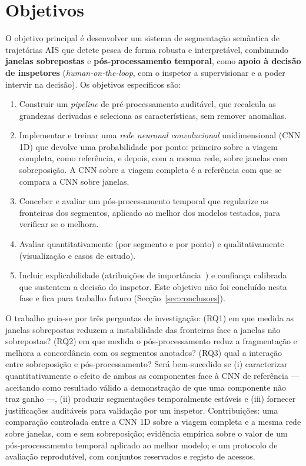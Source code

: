 \documentclass{article}
\newcommand{\revtext}[2]{{\color{#1}#2}}
\begin{document}
\section{Objetivos}
\label{sec:objetivos}

O objetivo principal é desenvolver um sistema de segmentação semântica de trajetórias AIS que detete pesca de forma robusta e interpretável, combinando \textbf{janelas sobrepostas} e \textbf{pós-processamento temporal}, como \textbf{apoio à decisão de inspetores} (\revtext{rev062}{\emph{human-on-the-loop}, com o inspetor a supervisionar e a poder intervir na decisão}). Os objetivos específicos são:

\begin{enumerate}
    \item Construir um \emph{pipeline} de pré-processamento auditável, que recalcula as grandezas derivadas e seleciona as características, sem remover anomalias.
    \item Implementar e treinar uma \emph{rede neuronal convolucional} unidimensional (CNN 1D) que devolve uma probabilidade por ponto: primeiro sobre a viagem completa, como referência, e depois, com a mesma rede, sobre janelas com sobreposição. A CNN sobre a viagem completa é a referência com que se compara a CNN sobre janelas.
    \item Conceber e avaliar um pós-processamento temporal \revtext{rev062}{que regularize as fronteiras dos segmentos, aplicado ao melhor dos modelos testados, para verificar se o melhora}.
    \item Avaliar quantitativamente (por segmento e por ponto) e qualitativamente (visualização e casos de estudo).
    \item Incluir explicabilidade (atribuições de importância~\cite{lundberg2017}) e confiança calibrada~\cite{guo2017} que sustentem a decisão do inspetor. \revtext{rev062}{Este objetivo não foi concluído nesta fase e fica para trabalho futuro (Secção~\ref{sec:conclusoes}).}
\end{enumerate}

O trabalho guia-se por três perguntas de investigação: (RQ1) em que medida as janelas sobrepostas reduzem a instabilidade das fronteiras face a janelas não sobrepostas? (RQ2) em que medida o pós-processamento reduz a fragmentação e melhora a concordância com os segmentos anotados? (RQ3) qual a interação entre sobreposição e pós-processamento? Será bem-sucedido se (i) caracterizar quantitativamente o efeito de ambas as componentes face à CNN de referência --- aceitando como resultado válido a demonstração de que uma componente não traz ganho ---, (ii) produzir segmentações temporalmente estáveis e (iii) fornecer justificações auditáveis para validação por um inspetor. \revtext{rev062}{Contribuições: uma comparação controlada entre a CNN 1D sobre a viagem completa e a mesma rede sobre janelas, com e sem sobreposição; evidência empírica sobre o valor de um pós-processamento temporal aplicado ao melhor modelo; e um protocolo de avaliação reprodutível, com conjuntos reservados e registo de acessos.}
\end{document}
